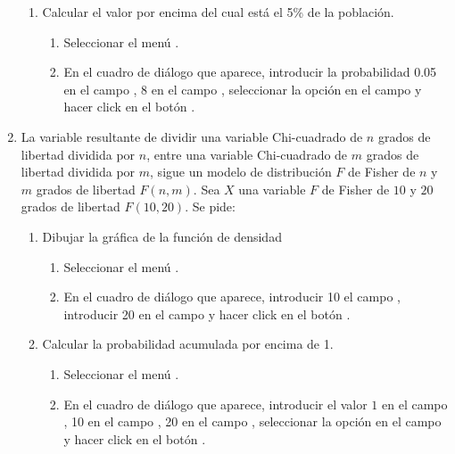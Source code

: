 \begin{enumerate}[leftmargin=*]
\begin{enumerate}
\item Calcular el valor por encima del cual está el 5\% de la población. 
\begin{indicacion}
\begin{enumerate}
\item Seleccionar el menú .
\item En el cuadro de diálogo que aparece, introducir la probabilidad 0.05 en el campo , 8 en el
campo , seleccionar la opción  en el campo  y hacer
click en el botón .
\end{enumerate}
\end{indicacion}
\end{enumerate}

\item La variable resultante de dividir una variable Chi-cuadrado de $n$ grados de libertad dividida por $n$, entre una
variable Chi-cuadrado de $m$ grados de libertad dividida por $m$, sigue un modelo de distribución $F$ de Fisher de $n$ y
$m$ grados de libertad $F(n,m)$. 
Sea $X$ una variable $F$ de Fisher de $10$ y $20$ grados de libertad $F(10,20)$. 
Se pide:
\begin{enumerate}
\item Dibujar la gráfica de la función de densidad
\begin{indicacion}
\begin{enumerate}
\item Seleccionar el menú .
\item En el cuadro de diálogo que aparece, introducir 10 el campo , introducir 20 en el campo  y hacer click en el botón .
\end{enumerate}
\end{indicacion}

\item Calcular la probabilidad acumulada por encima de 1. 
\begin{indicacion}
\begin{enumerate}
\item Seleccionar el menú .
\item En el cuadro de diálogo que aparece, introducir el valor $1$ en el campo , 10 en el
campo , 20 en el campo , seleccionar
la opción  en el campo  y hacer click en el botón .
\end{enumerate}
\end{indicacion}


\end{enumerate}
\end{enumerate}
